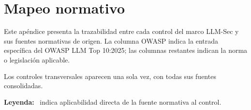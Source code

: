 \chapter{Mapeo normativo}
\label{app:mapeo}

Este apéndice presenta la trazabilidad entre cada control del marco LLM-Sec y sus fuentes normativas de origen. La columna OWASP indica la entrada específica del OWASP LLM Top 10:2025; las columnas restantes indican la norma o legislación aplicable.

Los controles transversales aparecen una sola vez, con todas sus fuentes consolidadas.

\begin{infobox}
  \textbf{Leyenda:} \checkmark\ indica aplicabilidad directa de la fuente normativa al control.
\end{infobox}

